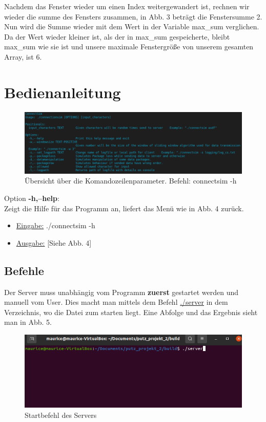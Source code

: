 \documentclass{article}
\begin{document}
Nachdem das Fenster wieder um einen Index weitergewandert ist, rechnen wir wieder die summe des Fensters zusammen, in Abb. 3 beträgt die Fenstersumme 2. Nun wird die Summe wieder mit dem Wert in
der Variable max\_sum verglichen. Da der Wert wieder kleiner ist, als der in max\_sum gespeicherte, bleibt max\_sum wie sie ist und unsere maximale Fenstergröße von unserem gesamten Array, ist 6.

\section{Bedienanleitung}
\begin{center}
\begin{figure}[h]
    \centering
    \includegraphics[width=\textwidth]{connectsim-h.png}
    \caption{Übersicht über die Komandozeilenparameter. Befehl: connectsim -h}
\end{figure}
\end{center}

Option \textbf{-h,--help}:\\
Zeigt die Hilfe für das Programm an, liefert das Menü wie in Abb. 4 zurück.
\begin{itemize}
	\item \underline{Eingabe:} ./connectsim -h
	\item \underline{Ausgabe:} [Siehe Abb. 4]\\
\end{itemize}

\break

\subsection{Befehle}
Der Server muss unabhängig vom Programm \textbf{zuerst} gestartet werden und manuell vom User. Dies macht man mittels dem Befehl \underline{./server} in dem Verzeichnis, wo die Datei zum starten
liegt. Eine Abfolge und das Ergebnis sieht man in Abb. 5.

\begin{center}
\begin{figure}[h]
    \centering
    \includegraphics[width=\textwidth]{connectsimserver.png}
    \caption{Startbefehl des Servers}
\end{figure}
\end{center}
\end{document}
